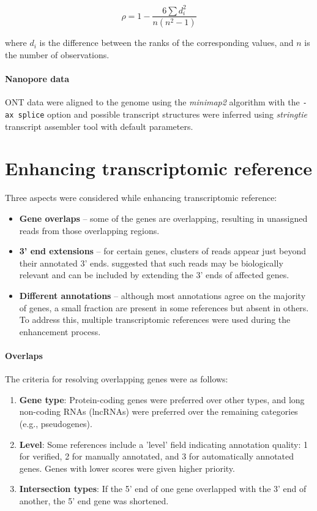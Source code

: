 $$\rho = 1 - \frac{6 \sum d_i^2}{n(n^2 - 1)}$$

where $d_i$ is the difference between the ranks of the corresponding values, and $n$ is the number of observations.

\paragraph{Nanopore data}

ONT data were aligned to the genome using the \textit{minimap2} algorithm with the \texttt{-ax splice} option
and possible transcript structures were inferred using \textit{stringtie} transcript assembler tool with default parameters.

\section{Enhancing transcriptomic reference}
\label{sec:overlappers}

Three aspects were considered while enhancing transcriptomic reference:
\begin{itemize}
  \item \textbf{Gene overlaps} – some of the genes are overlapping, resulting in unassigned reads from those overlapping regions.
  \item \textbf{3' end extensions} – for certain genes, clusters of reads appear just beyond their annotated 3' ends.
  \textcite{Pool2023} suggested that such reads may be biologically relevant and
  can be included by extending the 3' ends of affected genes.
  \item \textbf{Different annotations} – although most annotations agree on the majority of genes,
  a small fraction are present in some references but absent in others.
  To address this, multiple transcriptomic references were used during the enhancement process.
\end{itemize}

\paragraph{Overlaps}

The criteria for resolving overlapping genes were as follows:
\begin{enumerate}
  \item \textbf{Gene type}: Protein-coding genes were preferred over other types,
  and long non-coding RNAs (lncRNAs) were preferred over the remaining categories (e.g., pseudogenes).
  \item \textbf{Level}: Some references include a 'level' field indicating annotation quality:
  1 for verified, 2 for manually annotated, and 3 for automatically annotated genes.
  Genes with lower scores were given higher priority.
  \item \textbf{Intersection types}: If the 5' end of one gene overlapped with the 3' end of another,
  the 5' end gene was shortened.
\end{enumerate}

